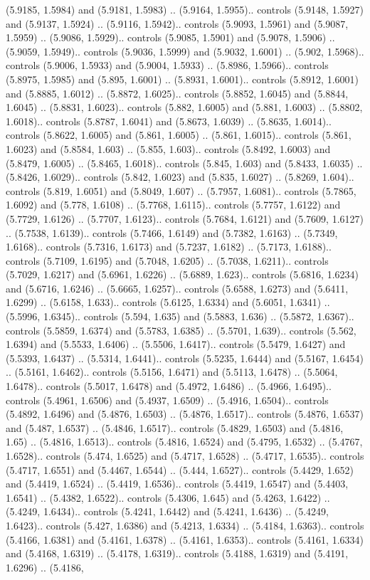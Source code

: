 (5.9185, 1.5984) and (5.9181, 1.5983) .. (5.9164, 1.5955).. controls (5.9148, 1.5927) and (5.9137, 1.5924) .. (5.9116, 1.5942).. controls (5.9093, 1.5961) and (5.9087, 1.5959) .. (5.9086, 1.5929).. controls (5.9085, 1.5901) and (5.9078, 1.5906) .. (5.9059, 1.5949).. controls (5.9036, 1.5999) and (5.9032, 1.6001) .. (5.902, 1.5968).. controls (5.9006, 1.5933) and (5.9004, 1.5933) .. (5.8986, 1.5966).. controls (5.8975, 1.5985) and (5.895, 1.6001) .. (5.8931, 1.6001).. controls (5.8912, 1.6001) and (5.8885, 1.6012) .. (5.8872, 1.6025).. controls (5.8852, 1.6045) and (5.8844, 1.6045) .. (5.8831, 1.6023).. controls (5.882, 1.6005) and (5.881, 1.6003) .. (5.8802, 1.6018).. controls (5.8787, 1.6041) and (5.8673, 1.6039) .. (5.8635, 1.6014).. controls (5.8622, 1.6005) and (5.861, 1.6005) .. (5.861, 1.6015).. controls (5.861, 1.6023) and (5.8584, 1.603) .. (5.855, 1.603).. controls (5.8492, 1.6003) and (5.8479, 1.6005) .. (5.8465, 1.6018).. controls (5.845, 1.603) and (5.8433, 1.6035) .. (5.8426, 1.6029).. controls (5.842, 1.6023) and (5.835, 1.6027) .. (5.8269, 1.604).. controls (5.819, 1.6051) and (5.8049, 1.607) .. (5.7957, 1.6081).. controls (5.7865, 1.6092) and (5.778, 1.6108) .. (5.7768, 1.6115).. controls (5.7757, 1.6122) and (5.7729, 1.6126) .. (5.7707, 1.6123).. controls (5.7684, 1.6121) and (5.7609, 1.6127) .. (5.7538, 1.6139).. controls (5.7466, 1.6149) and (5.7382, 1.6163) .. (5.7349, 1.6168).. controls (5.7316, 1.6173) and (5.7237, 1.6182) .. (5.7173, 1.6188).. controls (5.7109, 1.6195) and (5.7048, 1.6205) .. (5.7038, 1.6211).. controls (5.7029, 1.6217) and (5.6961, 1.6226) .. (5.6889, 1.623).. controls (5.6816, 1.6234) and (5.6716, 1.6246) .. (5.6665, 1.6257).. controls (5.6588, 1.6273) and (5.6411, 1.6299) .. (5.6158, 1.633).. controls (5.6125, 1.6334) and (5.6051, 1.6341) .. (5.5996, 1.6345).. controls (5.594, 1.635) and (5.5883, 1.636) .. (5.5872, 1.6367).. controls (5.5859, 1.6374) and (5.5783, 1.6385) .. (5.5701, 1.639).. controls (5.562, 1.6394) and (5.5533, 1.6406) .. (5.5506, 1.6417).. controls (5.5479, 1.6427) and (5.5393, 1.6437) .. (5.5314, 1.6441).. controls (5.5235, 1.6444) and (5.5167, 1.6454) .. (5.5161, 1.6462).. controls (5.5156, 1.6471) and (5.5113, 1.6478) .. (5.5064, 1.6478).. controls (5.5017, 1.6478) and (5.4972, 1.6486) .. (5.4966, 1.6495).. controls (5.4961, 1.6506) and (5.4937, 1.6509) .. (5.4916, 1.6504).. controls (5.4892, 1.6496) and (5.4876, 1.6503) .. (5.4876, 1.6517).. controls (5.4876, 1.6537) and (5.487, 1.6537) .. (5.4846, 1.6517).. controls (5.4829, 1.6503) and (5.4816, 1.65) .. (5.4816, 1.6513).. controls (5.4816, 1.6524) and (5.4795, 1.6532) .. (5.4767, 1.6528).. controls (5.474, 1.6525) and (5.4717, 1.6528) .. (5.4717, 1.6535).. controls (5.4717, 1.6551) and (5.4467, 1.6544) .. (5.444, 1.6527).. controls (5.4429, 1.652) and (5.4419, 1.6524) .. (5.4419, 1.6536).. controls (5.4419, 1.6547) and (5.4403, 1.6541) .. (5.4382, 1.6522).. controls (5.4306, 1.645) and (5.4263, 1.6422) .. (5.4249, 1.6434).. controls (5.4241, 1.6442) and (5.4241, 1.6436) .. (5.4249, 1.6423).. controls (5.427, 1.6386) and (5.4213, 1.6334) .. (5.4184, 1.6363).. controls (5.4166, 1.6381) and (5.4161, 1.6378) .. (5.4161, 1.6353).. controls (5.4161, 1.6334) and (5.4168, 1.6319) .. (5.4178, 1.6319).. controls (5.4188, 1.6319) and (5.4191, 1.6296) .. (5.4186, 